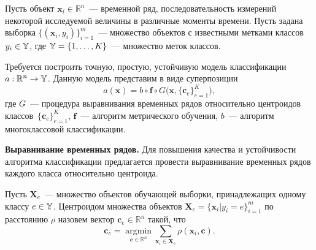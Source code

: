 \documentclass[11pt, a5paper]{dissert}
\begin{document}
Пусть объект $\mathbf{x}_i \in \mathbb{R}^n$~--- временной ряд, последовательность измерений некоторой исследуемой величины в различные моменты времени.
Пусть задана выборка $\{(\mathbf{x}_i, y_i)\}_{i=1}^m$~--- множество объектов с известными метками классов $y_i \in \mathbb{Y}$, где $\mathbb{Y} = \{1, \dots, K\}$~--- множество меток классов.

Требуется построить точную, простую, устойчивую модель классификации $a: \mathbb{R}^n \to \mathbb{Y}$.
Данную модель представим в виде суперпозиции
\begin{equation*}
	a(\mathbf{x}) = b \circ \mathbf{f} \circ G\bigl(\mathbf{x}, \{\mathbf{c}_e\}_{e = 1} ^ K\bigr),
\end{equation*}
где $G$~--- процедура выравнивания временных рядов относительно центроидов классов~$\{\mathbf{c}_e\}_{e = 1} ^ K$, $\mathbf{f}$~--- алгоритм метрического обучения, $b$~--- алгоритм многоклассовой классификации.

\textbf{Выравнивание временных рядов.}
Для повышения качества и устойчивости алгоритма классификации предлагается провести выравнивание временных рядов каждого класса относительно центроида.

Пусть $\mathbf{X}_e$~--- множество объектов обучающей выборки, принадлежащих одному классу $e \in \mathbb{Y}$.
Центроидом множества объектов $\mathbf{X}_e = \{\mathbf{x}_i|y_i=e\}_{i=1}^m$ по расстоянию $\rho$ назовем вектор $\mathbf{c}_e \in \mathbb{R}^n$ такой, что
\begin{equation}
	\label{ch5:eq:centroid_task}
	\mathbf{c}_e = \mathop{\text{argmin}}\limits_{{\mathbf{c} \in \mathbb{R}^n}}\sum_{\mathbf{x}_i \in \mathbf{X}_e}
	{\rho(\mathbf{x}_i ,\mathbf{c})}.
\end{equation}
\end{document}
